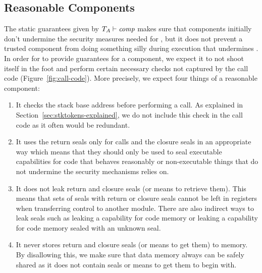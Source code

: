 \documentclass[acmsmall,screen]{acmart}\settopmatter{}
\renewcommand{\comp}{\var{comp}}
\newcommand{\wdjud}[2][ ]{#1 \vdash #2}
\begin{document}
\subsection{Reasonable Components}
\label{sec:reasonable-components}
The static guarantees given by $\wdjud[\ta]{\comp}$ makes sure that components initially don't undermine the security measures needed for \stktokens{}, but it does not prevent a trusted component from doing something silly during execution that undermines \stktokens{}.
In order for \stktokens{} to provide guarantees for a component, we expect it to not shoot itself in the foot and perform certain necessary checks not captured by the call code (Figure~\ref{fig:call-code}).
More precisely, we expect four things of a reasonable component:
\begin{enumerate}[label=(\arabic*)]
\item It checks the stack base address before performing a call.
As explained in Section~\ref{sec:stktokens-explained}, we do not include this check in the call code as it often would be redundant.
\item It uses the return seals only for calls and the closure seals in an appropriate way which means that they should only be used to seal executable capabilities for code that behaves reasonably or non-executable things that do not undermine the security mechanisms \stktokens{} relies on.
\item It does not leak return and closure seals (or means to retrieve them).
This means that sets of seals with return or closure seals cannot be left in registers when transferring control to another module.
There are also indirect ways to leak seals such as leaking a capability for code memory or leaking a capability for code memory sealed with an unknown seal.
\item It never stores return and closure seals (or means to get them) to memory.
By disallowing this, we make sure that data memory always can be safely shared as it does not contain seals or means to get them to begin with.
\end{enumerate}
\end{document}
